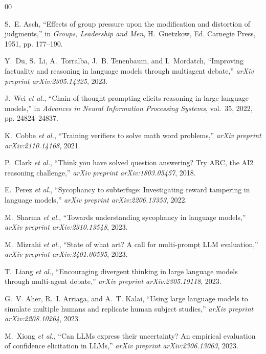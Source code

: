 \documentclass[conference]{IEEEtran}
\begin{document}

\begin{thebibliography}{00}

S.~E. Asch, ``Effects of group pressure upon the modification and distortion of
judgments,'' in \textit{Groups, Leadership and Men}, H.~Guetzkow, Ed.
Carnegie Press, 1951, pp. 177--190.

Y.~Du, S.~Li, A.~Torralba, J.~B. Tenenbaum, and I.~Mordatch,
``Improving factuality and reasoning in language models through multiagent debate,''
\textit{arXiv preprint arXiv:2305.14325}, 2023.

J.~Wei \textit{et al.}, ``Chain-of-thought prompting elicits reasoning in large
language models,'' in \textit{Advances in Neural Information Processing Systems},
vol.~35, 2022, pp. 24824--24837.

K.~Cobbe \textit{et al.}, ``Training verifiers to solve math word problems,''
\textit{arXiv preprint arXiv:2110.14168}, 2021.

P.~Clark \textit{et al.}, ``Think you have solved question answering? Try ARC, the
AI2 reasoning challenge,'' \textit{arXiv preprint arXiv:1803.05457}, 2018.

E.~Perez \textit{et al.}, ``Sycophancy to subterfuge: Investigating reward tampering
in language models,'' \textit{arXiv preprint arXiv:2206.13353}, 2022.

M.~Sharma \textit{et al.}, ``Towards understanding sycophancy in language models,''
\textit{arXiv preprint arXiv:2310.13548}, 2023.

M.~Mizrahi \textit{et al.}, ``State of what art? A call for multi-prompt LLM
evaluation,'' \textit{arXiv preprint arXiv:2401.00595}, 2023.

T.~Liang \textit{et al.}, ``Encouraging divergent thinking in large language models
through multi-agent debate,'' \textit{arXiv preprint arXiv:2305.19118}, 2023.

G.~V. Aher, R.~I. Arriaga, and A.~T. Kalai, ``Using large language models to simulate
multiple humans and replicate human subject studies,''
\textit{arXiv preprint arXiv:2208.10264}, 2023.

M.~Xiong \textit{et al.}, ``Can LLMs express their uncertainty? An empirical evaluation
of confidence elicitation in LLMs,'' \textit{arXiv preprint arXiv:2306.13063}, 2023.

\end{thebibliography}
\end{document}
